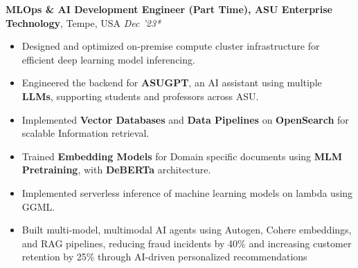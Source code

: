 \documentclass[10pt,a4]{article}
\begin{document}
{\begin{flushleft}
    \vspace{1.5mm}
    \hspace{1.5mm} \textbf{\large MLOps \& AI Development Engineer (Part Time), ASU Enterprise Technology},   Tempe, USA \hfill \textit{\large Dec '23*}	\\
    \begin{itemize}
        \item Designed and optimized on-premise compute cluster infrastructure for efficient deep learning model inferencing.
        \item Engineered the backend for \textbf{ASUGPT}, an AI assistant using multiple \textbf{LLMs}, supporting students and professors across ASU.
        \item Implemented \textbf{Vector Databases} and \textbf{Data Pipelines} on \textbf{OpenSearch} for scalable Information retrieval.
        \item Trained \textbf{Embedding Models} for Domain specific documents using \textbf{MLM Pretraining}, with  \textbf{DeBERTa} architecture.
        \item Implemented serverless inference of machine learning models on lambda using GGML.
        \item Built multi-model, multimodal AI agents using Autogen, Cohere embeddings, and RAG pipelines, reducing fraud incidents by 40\% and increasing customer retention by 25\% through AI-driven personalized recommendations

    \end{itemize}	
    

\end{flushleft}}
\end{document}

